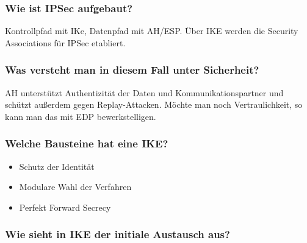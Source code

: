 	\subsubsection{Wie ist IPSec aufgebaut?}
	Kontrollpfad mit IKe, Datenpfad mit AH/ESP. Über IKE werden die Security Associations für IPSec etabliert.
	
	
	\subsubsection{Was versteht man in diesem Fall unter Sicherheit?}
	AH %
	unterstützt Authentizität der Daten und Kommunikationspartner und schützt außerdem gegen Replay-Attacken. Möchte man noch Vertraulichkeit, so kann man das mit EDP %
	bewerkstelligen.
	

	
	
	
	
	

	
	\subsubsection{Welche Bausteine hat eine IKE?}
		\begin{itemize}
			\item Schutz der Identität
			\item Modulare Wahl der Verfahren
			\item Perfekt Forward Secrecy
		\end{itemize}
	
	\subsubsection{Wie sieht in IKE der initiale Austausch aus?}
		
